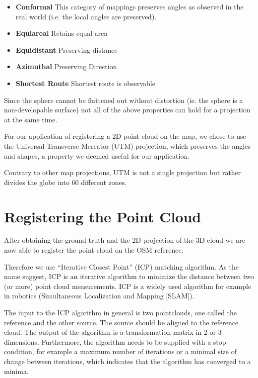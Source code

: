 \documentclass[10pt,twocolumn,letterpaper]{article}
\begin{document}
\begin{itemize}
   \item \textbf{Conformal} This category of mappings preserves angles as observed in the real world (i.e. the local angles are preserved). 
   \item \textbf{Equiareal} Retains equal area
   \item \textbf{Equidistant} Preserving distance
   \item \textbf{Azimuthal} Preserving Direction
   \item \textbf{Shortest Route} Shortest route is observable 
\end{itemize}

Since the sphere cannot be flattened out without distortion (ie. the sphere is a non-developable surface) not all of the above properties can hold for a projection at the same time.

For our application of registering a 2D point cloud on the map, we chose to use the Universal Transverse Mercator (UTM) projection, which preserves the angles and shapes, a property we deemed useful for our application.

Contrary to other map projections, UTM is not a single projection but rather divides the globe into 60 different zones.

\section{Registering the Point Cloud}

After obtaining the ground truth and the 2D projection of the 3D cloud we are now able to register the point cloud on the OSM reference.

Therefore we use ``Iterative Closest Point'' (ICP) matching algorithm. As the name suggest, ICP is an iterative algorithm to minimize the distance between two (or more) point cloud measurements. ICP is a widely used algorithm for example in robotics (Simultaneous Localization and Mapping [SLAM]). 

The input to the ICP algorithm in general is two pointclouds, one called the reference and the other source. The source should be aligned to the reference cloud. The output of the algorithm is a transformation matrix in 2 or 3 dimensions. Furthermore, the algorithm needs to be supplied with a stop condition, for example a maximum number of iterations or a minimal size of change between iterations, which indicates that the algorithm has converged to a minima.
\end{document}
